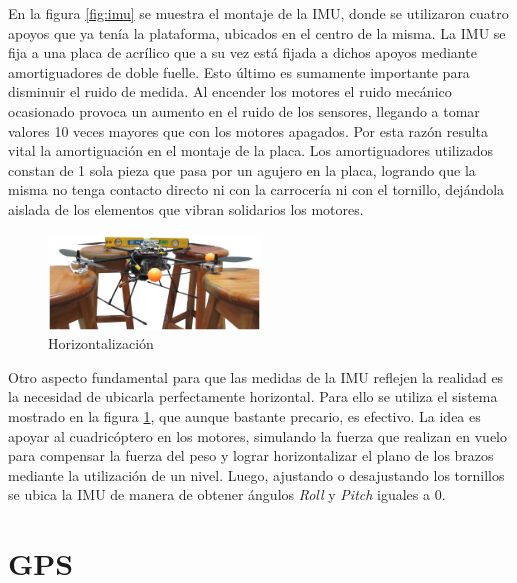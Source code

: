 \documentclass[main]{subfiles}
\begin{document}
En la figura \ref{fig:imu} se muestra el montaje de la IMU, donde se utilizaron cuatro apoyos que ya tenía la plataforma, ubicados en el centro de la misma. La IMU se fija a una placa de acrílico que a su vez está fijada a dichos apoyos mediante amortiguadores de doble fuelle. Esto último es sumamente importante para disminuir el ruido de medida. Al encender los motores el ruido mecánico ocasionado provoca un aumento en el ruido de los sensores, llegando a tomar valores 10 veces mayores que con los motores apagados. Por esta razón resulta vital la amortiguación en el montaje de la placa. Los amortiguadores utilizados constan de 1 sola pieza que pasa por un agujero en la placa, logrando que la misma no tenga contacto directo ni con la carrocería ni con el tornillo, dejándola aislada de los elementos que vibran solidarios los motores.\\

\begin{figure}
	\begin{center}
		\includegraphics[width=0.5\textwidth]{./pics_montaje/horizontalidad.jpg}
	\end{center}
	\caption{Horizontalización}
	\vspace{-10pt}
	\label{fig:horizontalidad}
\end{figure}

Otro aspecto fundamental para que las medidas de la IMU reflejen la realidad es la necesidad de ubicarla perfectamente horizontal. Para ello se utiliza el sistema mostrado en la figura \ref{fig:horizontalidad}, que aunque bastante precario, es efectivo. La idea es apoyar al cuadricóptero en los motores, simulando la fuerza que realizan en vuelo para compensar la fuerza del peso y lograr horizontalizar el plano de los brazos mediante la utilización de un nivel. Luego, ajustando o desajustando los tornillos se ubica la IMU de manera de obtener ángulos \emph{Roll} y \emph{Pitch} iguales a $0$.

\section{GPS}
\end{document}
